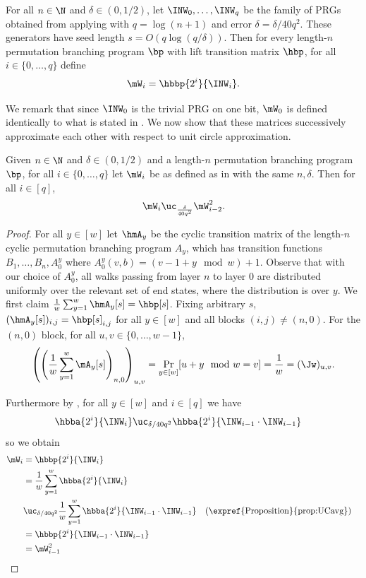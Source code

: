 \documentclass{toc}
\begin{document}
\begin{definition}\label{def:basePRGfamily}
For all $n\in \N$ and $\delta\in (0,1/2)$, let $\INW_{0},\ldots,\INW_{q}$ be the family of PRGs obtained from applying  with $q=\log(n+1)$ and error $\delta=\delta/40q^2$. These generators have seed length $s=O(q\log(q/\delta))$. Then for every length-$n$ permutation branching program $\bp$ with lift transition matrix $\hbp$, for all $i\in\{0,\dots,q\}$ define
$$\mW_i = \hbbp{2^i}{\INW_i}.$$ 
\end{definition}
We remark that since $\INW_0$ is the trivial PRG on one bit, $\mW_0$ is defined identically to what is stated in . We now show that these matrices successively approximate each other with respect to unit circle approximation.

\begin{lemma}\label{lem:WsUC}
Given $n\in\N$ and $\delta\in(0,1/2)$ and a length-$n$ permutation branching program $\bp$, for all $i\in\{0,\dots,q\}$ let $\mW_i$ be as defined as in  with the same $n,\delta$. Then for all $i\in [q]$,
$$\mW_{i} \uc_{\frac{\delta}{40q^2}} \mW_{i-2}^2.$$
\end{lemma}

\begin{proof}
For all $y\in [w]$ let $\hmA_y$ be the cyclic transition matrix of the length-$n$ cyclic permutation branching program $A_y$, which has transition functions $B_1,\ldots,B_n,A^y_0$ where $A^y_{0}(v,b)=(v-1+y \mod w)+1$. Observe that with %
%
our
%
choice of $A^y_0$, all walks passing from layer $n$ to layer $0$ are distributed uniformly over the relevant set of end states, where the distribution is over $y$. We first claim $\frac{1}{w}\sum_{y=1}^w\hmA_y[s]=\hbp[s]$. Fixing arbitrary $s$, $(\hmA_y[s])_{i,j}=\hbp[s]_{i,j}$ for all $y\in [w]$ and all blocks $(i,j)\neq (n,0)$. For the $(n,0)$ block, for all $u,v\in \{0,\dots,w-1\}$,
$$\left(\left(\frac{1}{w}\sum_{y=1}^w\mA_y[s]\right)_{n,0}\right)_{u,v} = \Pr_{y\in[w]}[u+y \mod w =v] = \frac{1}{w}=(\Jw)_{u,v}.$$

Furthermore by , for all $y \in [w]$ and $i\in [q]$ we have 
\begin{align*}
     \hbba{2^{i}}{\INW_{i}}
    &\uc_{\delta/40q^2}\hbba{2^{i}}{\INW_{i-1}\cdot\INW_{i-1}}%
\end{align*}
%
so 
we obtain %
\begin{align*}
    \mW_i &= \hbbp{2^i}{\INW_i}\\ 
    &= \frac{1}{w}\sum_{y=1}^w\hbba{2^{i}}{\INW_{i}}\\
    &\uc_{\delta/40q^2}\frac{1}{w}\sum_{y=1}^w \hbba{2^{i}}{\INW_{i-1}\cdot\INW_{i-1}} && \text{(\expref{Proposition}{prop:UCavg})}\\
    &= \hbbp{2^i}{\INW_{i-1}\cdot\INW_{i-1}}\\ 
    &= \mW_{i-1}^2
    &&\qedhere
\end{align*}

\end{proof}
\end{document}
